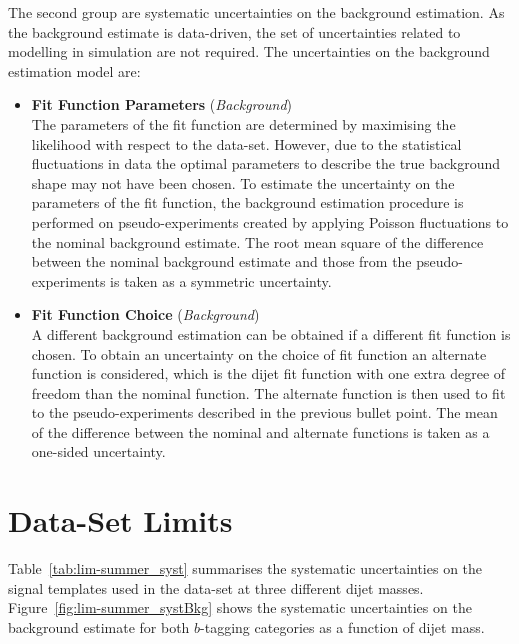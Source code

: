 The second group are systematic uncertainties on the background estimation.
As the background estimate is data-driven, the set of uncertainties related to modelling in simulation are not required.
The uncertainties on the background estimation model are:
\vspace{-0.5em}
\begin{itemize}[leftmargin=*]
\item \textbf{Fit Function Parameters} \hspace{1mm} (\textit{Background})\\
  The parameters of the fit function are determined by maximising the likelihood with respect to the data-set.
  However, due to the statistical fluctuations in data the optimal parameters to describe
  the true background shape may not have been chosen.
  To estimate the uncertainty on the parameters of the fit function,
  the background estimation procedure is performed on pseudo-experiments created by applying Poisson fluctuations to the nominal background estimate.
  The root mean square of the difference between the nominal background estimate and those from the pseudo-experiments is taken as a symmetric uncertainty. \vspace{0.5em}
\item\textbf{Fit Function Choice}  \hspace{1mm} (\textit{Background})\\
  A different background estimation can be obtained if a different fit function is chosen.
  To obtain an uncertainty on the choice of fit function an alternate function is considered,
  which is the dijet fit function with one extra degree of freedom than the nominal function.
  The alternate function is then used to fit to the pseudo-experiments described in the previous bullet point.
  The mean of the difference between the nominal and alternate functions is taken as a one-sided uncertainty.
  \vspace{0.5em}
\end{itemize}

\clearpage
\section{\summer{} Data-Set Limits}
\label{sec:lim-summer}

Table~\ref{tab:lim-summer_syst} summarises the systematic uncertainties
on the signal templates used in the \summer{} data-set at
three different dijet masses.
Figure~\ref{fig:lim-summer_systBkg} shows the systematic uncertainties on the background estimate
for both $b$-tagging categories as a function of dijet mass.

